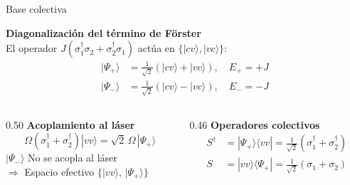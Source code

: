 \documentclass[
11pt,notheorems,hyperref={pdfauthor=whatever}
]{beamer}
\begin{document}
\begin{frame}{Base colectiva}
	
	\textbf{Diagonalización del término de Förster}\\[6pt]
	El operador $J(\sigma_1^\dagger\sigma_2 + \sigma_2^\dagger\sigma_1)$
	actúa en $\{|cv\rangle, |vc\rangle\}$:
	\begin{align*}
		|\Psi_+\rangle &= \tfrac{1}{\sqrt{2}}\left(|cv\rangle+|vc\rangle\right),
		\quad E_+=+J \\[4pt]
		|\Psi_-\rangle &= \tfrac{1}{\sqrt{2}}\left(|cv\rangle-|vc\rangle\right),
		\quad E_-=-J
	\end{align*}
	
		
	\begin{columns}[T]
		
		\begin{column}{0.50\textwidth}
			\vspace{6pt}
			\textbf{Acoplamiento al láser}\\[6pt]
			\begin{equation*}
				\Omega\!\left(\sigma_1^\dagger+\sigma_2^\dagger\right)|vv\rangle
				= \sqrt{2}\,\Omega\,|\Psi_+\rangle
			\end{equation*}
			\vspace{4pt}
			$|\Psi_-\rangle$ No se acopla al láser \\[4pt]
			$\Rightarrow$ Espacio efectivo $\{|vv\rangle,\,|\Psi_+\rangle\}$
		\end{column}
		
		\begin{column}{0.46\textwidth}
			\vspace{6pt}
			\textbf{Operadores colectivos}\\[6pt]
			\vspace{-8pt}
			\begin{align*}
				S^\dagger &= |\Psi_+\rangle\langle vv|
				= \frac{1}{\sqrt{2}}\!\left(\sigma_1^\dagger + \sigma_2^\dagger\right)\\[6pt]
				S &= |vv\rangle\langle\Psi_+|
				= \frac{1}{\sqrt{2}}\!\left(\sigma_1 + \sigma_2\right)
			\end{align*}
		\end{column}
		
	\end{columns}
	
	\vspace{12pt}


\end{frame}
\end{document}

